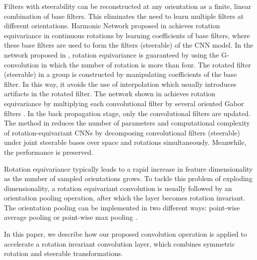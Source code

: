 Filters with steerability can be
reconstructed at any orientation as a finite, linear combination of base
filters. This eliminates the need to learn multiple filters at different
orientations.
Harmonic Network proposed in \cite{harmonic-cnn} 
achieves rotation equivariance in continuous rotations by  
learning coefficients of base filters, where
these base filters are used to form the filters (steerable) of the CNN model.
In the network proposed in \cite{G-cnn7},
rotation equivariance is guaranteed by using 
the G-convolution in which the number of rotation is more than four.
The rotated filter (steerable) in a group is constructed by manipulating coefficients of the base filter. 
In this way, it avoids the use of interpolation which usually introduces artifacts in the rotated filter.  
The network shown in \cite{gabor} achieves rotation equivariance by multiplying each convolutional filter by 
several oriented Gabor filters \cite{weldon1996efficient}. In the back propagation stage, only the convolutional filters are updated.
The method in \cite{cheng2018rotdcf} reduces the number of parameters and computational complexity of rotation-equivariant
CNNs by decomposing convolutional filters (steerable) under joint
steerable bases over space and rotations simultaneously. Meanwhile, the performance is preserved. 

Rotation equivariance typically leads to a rapid increase in feature dimensionality as the number of sampled orientations grows. To tackle this problem of exploding dimensionality, a rotation equivariant convolution is usually followed by an orientation pooling operation, after which the layer becomes rotation invariant. The orientation pooling can be implemented in two different ways: point-wise average pooling \cite{featureTrans} or point-wise max pooling \cite{shallowNet}.

In this paper, we describe how our proposed convolution operation is applied to accelerate a rotation invariant convolution layer, which combines symmetric rotation and steerable transformations. 